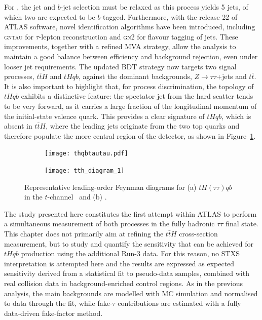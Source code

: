 For \thtt, the jet and $b$-jet selection must be relaxed as this process yields 5 jets, of which two are expected to be $b$-tagged. 
Furthermore, with the release 22 of ATLAS software, novel identification algorithms have been introduced, including \textsc{gntau} for $\tau$-lepton reconstruction and \textsc{gn2} for flavour tagging of jets. 
These improvements, together with a refined MVA strategy, allow the analysis to maintain a good balance between efficiency and background rejection, even under looser jet requirements. 
The updated BDT strategy now targets two signal processes, $t\bar{t}H$ and $tHqb$, against the dominant backgrounds, $Z\to\tau\tau$+jets and $t\bar{t}$. 
It is also important to highlight that, for process discrimination, the topology of $tHqb$ exhibits a distinctive feature: the spectator jet from the hard scatter tends to be very forward, as it carries a large fraction of the longitudinal momentum of the initial-state valence quark. This provides a clear signature of $tHqb$, which is absent in $t\bar{t}H$, where the leading jets originate from the two top quarks and therefore populate the more central region of the detector, as shown in Figure~\ref{fig:feynman_tH_ttH}.
\begin{figure}[htbp]
    \centering
    \begin{subfigure}[b]{0.37\textwidth}
      \centering
      \texttt{[image: thqbtautau.pdf]}
      \caption{}
    \end{subfigure}
    \begin{subfigure}[b]{0.4\textwidth}
      \centering
      \texttt{[image: tth\_diagram\_1]}
      \caption{}
    \end{subfigure}
    \caption{Representative leading-order Feynman diagrams for (a) $tH(\tau\tau)qb$ in the $t$-channel~\cite{Barger_2010} and (b) \ttHtt.}
    \label{fig:feynman_tH_ttH}
  \end{figure}

The study presented here constitutes the first attempt within ATLAS to perform a simultaneous measurement of both processes in the fully hadronic $\tau\tau$ final state. 
This chapter does not primarily aim at refining the $t\bar{t}H$ cross-section measurement, but to study and quantify the sensitivity that can be achieved for $tHqb$ production using the additional Run-3 data. 
For this reason, no STXS interpretation is attempted here and the results are expressed as expected sensitivity derived from a statistical fit to pseudo-data samples, combined with real collision data in background-enriched control regions. 
As in the previous analysis, the main backgrounds are modelled with MC simulation and normalised to data through the fit, while fake-$\tau$ contributions are estimated with a fully data-driven fake-factor method. 

